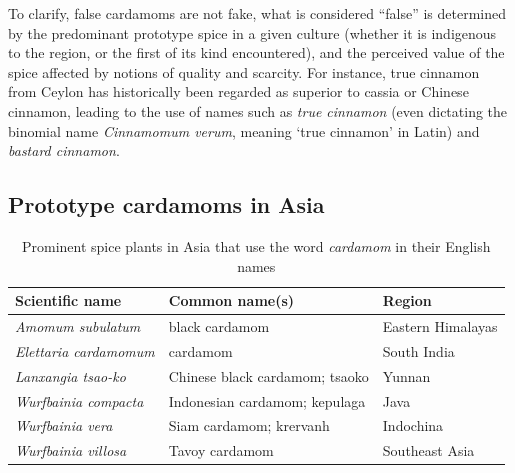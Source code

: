 \documentclass[12pt]{article}
\begin{document}
To clarify, false cardamoms are not fake, what is considered ``false'' is determined by the predominant prototype spice in a given culture (whether it is indigenous to the region, or the first of its kind encountered), and the perceived value of the spice affected by notions of quality and scarcity. For instance, true cinnamon from Ceylon has historically been regarded as superior to cassia or Chinese cinnamon, leading to the use of names such as \textit{true cinnamon} (even dictating the binomial name \textit{Cinnamomum verum}, meaning `true cinnamon' in Latin) and \textit{bastard cinnamon}.

\subsection{Prototype cardamoms in Asia}

\begin{table}[ht]
    \centering
    \begin{tabularx}{\textwidth}{@{}XXl@{}}
    \toprule
    \textbf{Scientific name} & \textbf{Common name(s)} & \textbf{Region} \\ \midrule
    \textit{Amomum subulatum} & black cardamom & Eastern Himalayas \\
    \textit{Elettaria cardamomum} & cardamom & South India \\
    \textit{Lanxangia tsao-ko} & Chinese black cardamom; tsaoko & Yunnan \\
    \textit{Wurfbainia compacta} & Indonesian cardamom; kepulaga & Java \\
    \textit{Wurfbainia vera} & Siam cardamom; krervanh & Indochina \\
    \textit{Wurfbainia villosa} & Tavoy cardamom & Southeast Asia \\ \bottomrule
    \end{tabularx}
    \caption{Prominent spice plants in Asia that use the word \textit{cardamom} in their English names}
    \label{tab:cardamoms}
\end{table}
\end{document}
